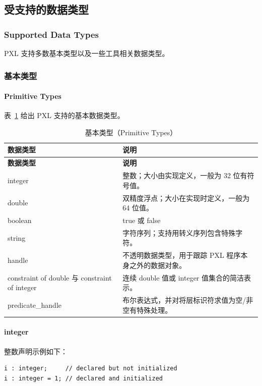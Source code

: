\subsection{受支持的数据类型}
\subsubsection*{Supported Data Types}

PXL 支持多数基本类型以及一些工具相关数据类型。

\subsubsection{基本类型}
\paragraph*{Primitive Types}

表~\ref{tab:pxl-primitive} 给出 PXL 支持的基本数据类型。

\begin{longtable}{@{}>{\raggedright\arraybackslash\ttfamily}p{} p{}@{}}
\caption{基本类型（Primitive Types）}\label{tab:pxl-primitive}\\
\toprule
\textbf{\textrm{数据类型}} & \textbf{\textrm{说明}} \\
\midrule
\endfirsthead
\toprule
\textbf{\textrm{数据类型}} & \textbf{\textrm{说明}} \\
\midrule
\endhead
\bottomrule
\endfoot
integer & 整数；大小由实现定义，一般为 32 位有符号值。 \\
double & 双精度浮点；大小在实现时定义，一般为 64 位值。 \\
boolean & true 或 false \\
string & 字符序列；支持用转义序列包含特殊字符。 \\
handle & 不透明数据类型，用于跟踪 PXL 程序本身之外的数据对象。 \\
constraint of double 与 constraint of integer & 连续 double 值或 integer 值集合的简洁表示。 \\
predicate\_handle & 布尔表达式，并对将层标识符求值为空/非空有特殊处理。 \\
\end{longtable}

\paragraph{integer}

整数声明示例如下：
\begin{lstlisting}[style=pxl]
i : integer;     // declared but not initialized
i : integer = 1; // declared and initialized
\end{lstlisting}

